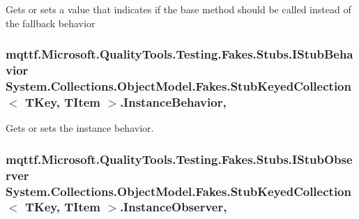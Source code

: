 Gets or sets a value that indicates if the base method should be called instead of the fallback behavior

\hypertarget{class_system_1_1_collections_1_1_object_model_1_1_fakes_1_1_stub_keyed_collection_3_01_t_key_00_01_t_item_01_4_adbb11a92e66814afbba7787dfaba37f5}{
\subsubsection[{Instance\-Behavior}]{\setlength{\rightskip}{0pt plus 5cm}mqttf.\-Microsoft.\-Quality\-Tools.\-Testing.\-Fakes.\-Stubs.\-I\-Stub\-Behavior System.\-Collections.\-Object\-Model.\-Fakes.\-Stub\-Keyed\-Collection$<$ T\-Key, T\-Item $>$.Instance\-Behavior\hspace{0.3cm}{\ttfamily [get]}, {\ttfamily [set]}}}\label{class_system_1_1_collections_1_1_object_model_1_1_fakes_1_1_stub_keyed_collection_3_01_t_key_00_01_t_item_01_4_adbb11a92e66814afbba7787dfaba37f5}


Gets or sets the instance behavior.

\hypertarget{class_system_1_1_collections_1_1_object_model_1_1_fakes_1_1_stub_keyed_collection_3_01_t_key_00_01_t_item_01_4_aff7a9ed289fb2487562e64436c26e90a}{
\subsubsection[{Instance\-Observer}]{\setlength{\rightskip}{0pt plus 5cm}mqttf.\-Microsoft.\-Quality\-Tools.\-Testing.\-Fakes.\-Stubs.\-I\-Stub\-Observer System.\-Collections.\-Object\-Model.\-Fakes.\-Stub\-Keyed\-Collection$<$ T\-Key, T\-Item $>$.Instance\-Observer\hspace{0.3cm}{\ttfamily [get]}, {\ttfamily [set]}}}\label{class_system_1_1_collections_1_1_object_model_1_1_fakes_1_1_stub_keyed_collection_3_01_t_key_00_01_t_item_01_4_aff7a9ed289fb2487562e64436c26e90a}


